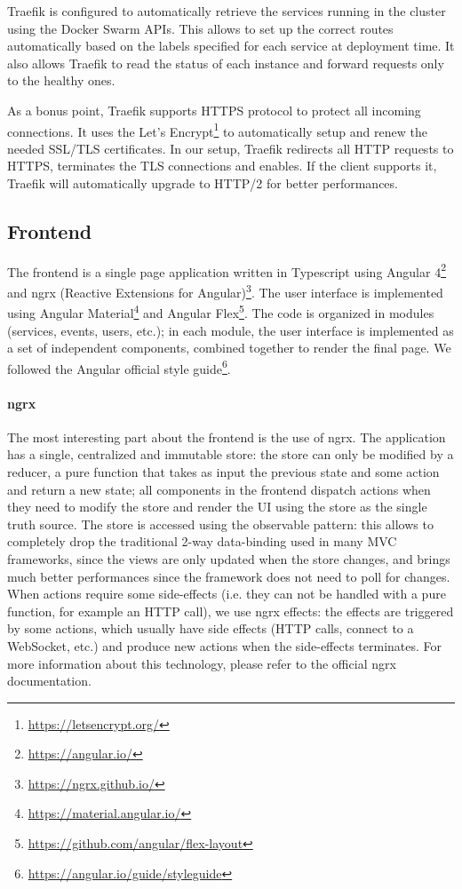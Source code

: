 Traefik is configured to automatically retrieve the services running in the cluster using the Docker Swarm APIs.
This allows to set up the correct routes automatically based on the labels specified for each service at deployment time.
It also allows Traefik to read the status of each instance and forward requests only to the healthy ones.

As a bonus point, Traefik supports HTTPS protocol to protect all incoming connections.
It uses the Let's Encrypt\footnote{\url{https://letsencrypt.org/}} to automatically setup and renew the needed SSL/TLS certificates.
In our setup, Traefik redirects all HTTP requests to HTTPS, terminates the TLS connections and enables.
If the client supports it, Traefik will automatically upgrade to HTTP/2 for better performances.


\subsection{Frontend}
The frontend is a single page application written in Typescript using Angular 4\footnote{\url{https://angular.io/}} and ngrx (Reactive Extensions for Angular)\footnote{\url{https://ngrx.github.io/}}.
The user interface is implemented using Angular Material\footnote{\url{https://material.angular.io/}} and Angular Flex\footnote{\url{https://github.com/angular/flex-layout}}.
The code is organized in modules (services, events, users, etc.);
in each module, the user interface is implemented as a set of independent components, combined together to render the final page.
We followed the Angular official style guide\footnote{\url{https://angular.io/guide/styleguide}}.

\paragraph{ngrx}
The most interesting part about the frontend is the use of ngrx.
The application has a single, centralized and immutable store:
the store can only be modified by a reducer, a pure function that takes as input the previous state and some action and return a new state;
all components in the frontend dispatch actions when they need to modify the store and render the UI using the store as the single truth source.
The store is accessed using the observable pattern:
this allows to completely drop the traditional 2-way data-binding used in many MVC frameworks, since the views are only updated when the store changes, and brings much better performances since the framework does not need to poll for changes.
When actions require some side-effects (i.e. they can not be handled with a pure function, for example an HTTP call), we use ngrx effects:
the effects are triggered by some actions, which usually have side effects (HTTP calls, connect to a WebSocket, etc.) and produce new actions when the side-effects terminates.
For more information about this technology, please refer to the official ngrx documentation.

